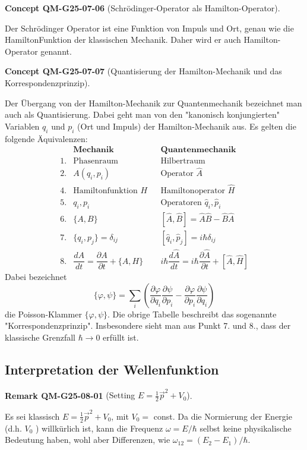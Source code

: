 \documentclass[10pt, letterpaper]{article}
\newcommand{\CustomHeading}[3]{%
  \par\medskip\noindent%
  \textbf{#1 #2} \textnormal{(#3)}.\enskip%
}
\newenvironment{REM}[2]{\CustomHeading{Remark}{#1}{#2}}{}
\newenvironment{CONC}[2]{\CustomHeading{Concept}{#1}{#2}}{}
\begin{document}
\begin{CONC}{QM-G25-07-06}{Schrödinger-Operator als Hamilton-Operator}
Der Schrödinger Operator ist eine Funktion von Impuls und Ort, genau wie die HamiltonFunktion der klassischen Mechanik. Daher wird er auch Hamilton-Operator genannt.
\end{CONC}

\begin{CONC}{QM-G25-07-07}{Quantisierung der Hamilton-Mechanik und das Korrespondenzprinzip}
Der Übergang von der Hamilton-Mechanik zur Quantenmechanik bezeichnet man auch als Quantisierung. Dabei geht man von den "kanonisch konjungierten" Variablen $q_{i}$ und $p_{i}$ (Ort und Impuls) der Hamilton-Mechanik aus. Es gelten die folgende Äquivalenzen:
\[
\begin{array}{rlrl}
 &\textbf{Mechanik} & &\textbf{Quantenmechanik} \\
1. & \text{Phasenraum} & & \text{Hilbertraum} \\
2. & A(q_i, p_i) & & \text{Operator } \hat{A} \\
4. & \text{Hamiltonfunktion } H & & \text{Hamiltonoperator } \hat{H} \\
5. & q_i, p_i & & \text{Operatoren } \hat{q}_i, \hat{p}_i \\
6. & \{A, B\} & & [\hat{A}, \hat{B}] = \hat{A} \hat{B} - \hat{B} \hat{A} \\
7. & \{q_i, p_j\} = \delta_{ij} & & [\hat{q}_i, \hat{p}_j] = i\hbar \delta_{ij} \\
8. & \dfrac{dA}{dt} = \dfrac{\partial A}{\partial t} + \{A, H\}
   & & i\hbar \dfrac{d \hat{A}}{dt} = i\hbar \dfrac{\partial \hat{A}}{\partial t} + [\hat{A}, \hat{H}]
\end{array}
\]
Dabei bezeichnet
$$
\{\varphi, \psi\}=\sum_{i}\left(\frac{\partial \varphi}{\partial q_{i}} \frac{\partial \psi}{\partial p_{i}}-\frac{\partial \varphi}{\partial p_{i}} \frac{\partial \psi}{\partial q_{i}}\right)
$$
die Poisson-Klammer $\{\varphi, \psi\}$. Die obrige Tabelle beschreibt das sogenannte "Korrespondenzprinzip". Insbesondere sieht man aus Punkt 7. und 8., dass der klassische Grenzfall $\hbar \rightarrow 0$ erfüllt ist.
\end{CONC}

\subsection{Interpretation der Wellenfunktion}

\begin{REM}{QM-G25-08-01}{Setting $E=\frac{1}{2} \vec{p}^{2}+V_{0}$}
Es sei klassisch $E=\frac{1}{2} \vec{p}^{2}+V_{0}$, mit $V_{0}=$ const. Da die Normierung der Energie (d.h. $V_{0}$ ) willkürlich ist, kann die Frequenz $\omega=E / \hbar$ selbst keine physikalische Bedeutung haben, wohl aber Differenzen, wie $\omega_{12}=\left(E_{2}-E_{1}\right) / \hbar$.
\end{REM}
\end{document}

